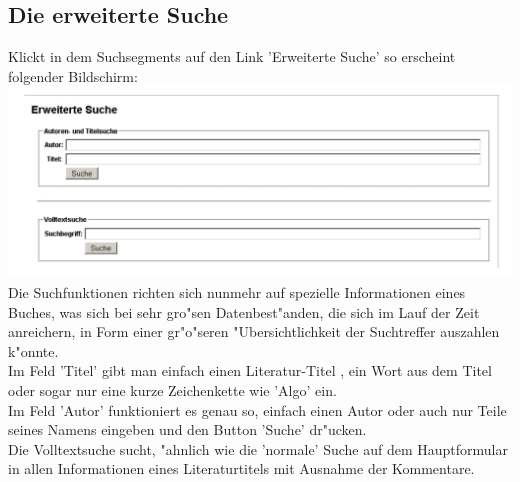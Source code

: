 \subsection{Die erweiterte Suche}
Klickt in dem Suchsegments auf den Link 'Erweiterte Suche' so erscheint folgender Bildschirm:\\
\includegraphics[scale=0.8]{ext_suche}\\
Die Suchfunktionen richten sich nunmehr auf spezielle Informationen eines Buches, was sich bei sehr gro"sen Datenbest"anden, die sich im Lauf der Zeit anreichern, in Form einer gr"o"seren "Ubersichtlichkeit der Suchtreffer auszahlen k"onnte.\\
Im Feld 'Titel' gibt man einfach einen Literatur-Titel , ein Wort aus dem Titel oder sogar nur eine kurze Zeichenkette wie 'Algo' ein.\\
Im Feld 'Autor' funktioniert es genau so, einfach einen Autor oder auch nur Teile seines Namens eingeben und den Button 'Suche' dr"ucken.\\
Die Volltextsuche sucht, "ahnlich wie die 'normale' Suche auf dem Hauptformular in allen Informationen eines Literaturtitels mit Ausnahme der Kommentare.\\

